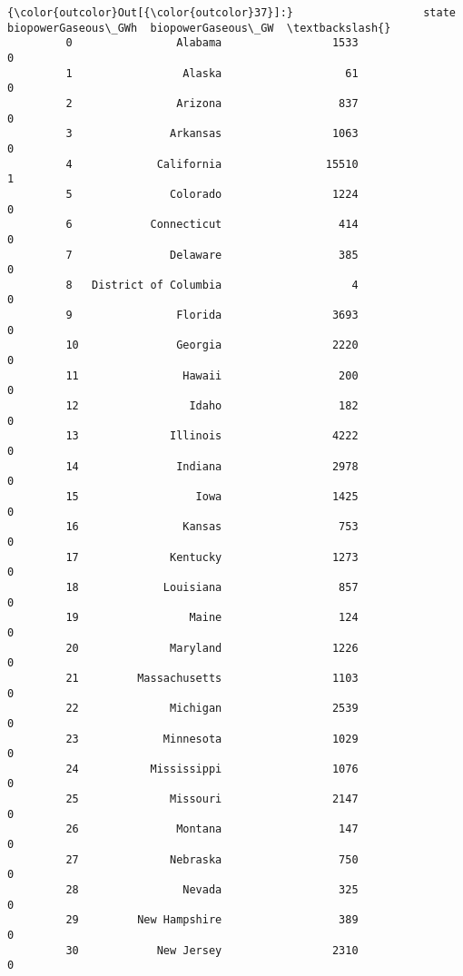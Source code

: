 \documentclass[11pt]{article}
\begin{document}
\begin{Verbatim}[commandchars=\\\{\}]
{\color{outcolor}Out[{\color{outcolor}37}]:}                    state  biopowerGaseous\_GWh  biopowerGaseous\_GW  \textbackslash{}
         0                Alabama                 1533                   0   
         1                 Alaska                   61                   0   
         2                Arizona                  837                   0   
         3               Arkansas                 1063                   0   
         4             California                15510                   1   
         5               Colorado                 1224                   0   
         6            Connecticut                  414                   0   
         7               Delaware                  385                   0   
         8   District of Columbia                    4                   0   
         9                Florida                 3693                   0   
         10               Georgia                 2220                   0   
         11                Hawaii                  200                   0   
         12                 Idaho                  182                   0   
         13              Illinois                 4222                   0   
         14               Indiana                 2978                   0   
         15                  Iowa                 1425                   0   
         16                Kansas                  753                   0   
         17              Kentucky                 1273                   0   
         18             Louisiana                  857                   0   
         19                 Maine                  124                   0   
         20              Maryland                 1226                   0   
         21         Massachusetts                 1103                   0   
         22              Michigan                 2539                   0   
         23             Minnesota                 1029                   0   
         24           Mississippi                 1076                   0   
         25              Missouri                 2147                   0   
         26               Montana                  147                   0   
         27              Nebraska                  750                   0   
         28                Nevada                  325                   0   
         29         New Hampshire                  389                   0   
         30            New Jersey                 2310                   0   

\end{Verbatim}
\end{document}
